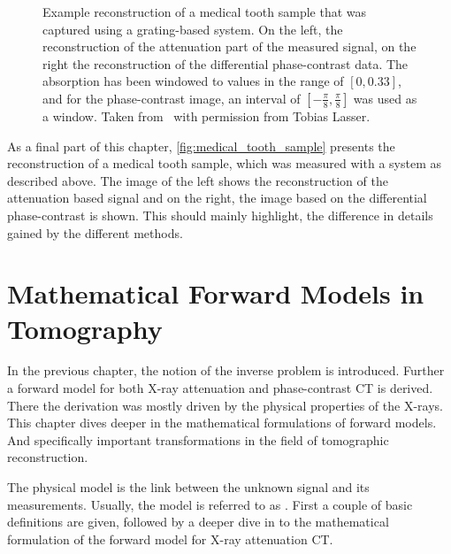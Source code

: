 \begin{figure}
	\centering
	\caption{Example reconstruction of a medical tooth sample that was captured using a
		grating-based system. On the left, the reconstruction of the attenuation part of the
		measured signal, on the right the reconstruction of the differential phase-contrast
		data. The absorption has been windowed to values in the range of \([0, 0.33]\), and
		for the phase-contrast image, an interval of \([-\frac{\pi}{8}, \frac{\pi}{8}]\) was
		used as a window. Taken from~\cite{wieczorek_anisotropic_2017} with permission from
		Tobias Lasser.}
	\label{fig:medical_tooth_sample}
\end{figure}

As a final part of this chapter, \autoref{fig:medical_tooth_sample} presents the reconstruction of a
medical tooth sample, which was measured with a system as described above. The image of the left
shows the reconstruction of the attenuation based signal and on the right, the image based on the
differential phase-contrast is shown. This should mainly highlight, the difference in details gained
by the different methods.

\chapter{Mathematical Forward Models in Tomography}\label{chap:radon_transform_and_related}

In the previous chapter, the notion of the inverse problem is introduced. Further a forward model
for both X-ray attenuation and phase-contrast CT is derived. There the derivation was mostly driven
by the physical properties of the X-rays. This chapter dives deeper in the mathematical formulations
of forward models. And specifically important transformations in the field of tomographic
reconstruction.

The physical model is the link between the unknown signal and its measurements. Usually, the model
is referred to as . First a couple of basic definitions are given, followed by a
deeper dive in to the mathematical formulation of the forward model for X-ray attenuation CT\@.

